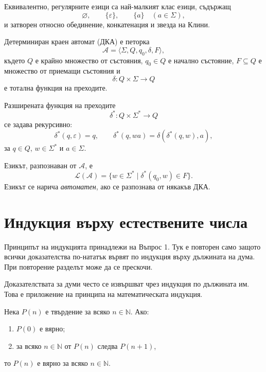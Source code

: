 Еквивалентно, регулярните езици са най-малкият клас езици, съдържащ
\[
\varnothing,\qquad \{\varepsilon\},\qquad \{a\}\quad(a\in\Sigma),
\]
и затворен относно обединение, конкатенация и звезда на Клини.

\begin{defn}
Детерминиран краен автомат (ДКА) е петорка
\[
\mathcal A=\langle\Sigma,Q,q_0,\delta,F\rangle,
\]
където $Q$ е крайно множество от състояния, $q_0\in Q$ е начално състояние,
$F\subseteq Q$ е множество от приемащи състояния и
\[
\delta:Q\times\Sigma\longrightarrow Q
\]
е тотална функция на преходите.
\end{defn}

\begin{defn}
Разширената функция на преходите
\[
\delta^*:Q\times\Sigma^*\longrightarrow Q
\]
се задава рекурсивно:
\[
\delta^*(q,\varepsilon)=q,\qquad
\delta^*(q,wa)=\delta(\delta^*(q,w),a),
\]
за $q\in Q$, $w\in\Sigma^*$ и $a\in\Sigma$.
\end{defn}

\begin{defn}
Езикът, разпознаван от $\mathcal A$, е
\[
\mathcal L(\mathcal A)=
\{w\in\Sigma^*\mid \delta^*(q_0,w)\in F\}.
\]
Езикът се нарича \emph{автоматен}, ако се разпознава от някакъв ДКА.
\end{defn}

\section{Индукция върху естествените числа}\label{s:4.2}

\begin{supp}
Принципът на индукцията принадлежи на Въпрос 1. Тук е повторен само защото
всички доказателства по-нататък вървят по индукция върху дължината на дума. При
повторение разделът може да се прескочи.
\end{supp}

Доказателствата за думи често се извършват чрез индукция по дължината им. Това е приложение на принципа на математическата индукция.

\begin{prop}
Нека $P(n)$ е твърдение за всяко $n\in\mathbb N$. Ако:
\begin{enumerate}
\item $P(0)$ е вярно;
\item за всяко $n\in\mathbb N$ от $P(n)$ следва $P(n+1)$,
\end{enumerate}
то $P(n)$ е вярно за всяко $n\in\mathbb N$.
\end{prop}

